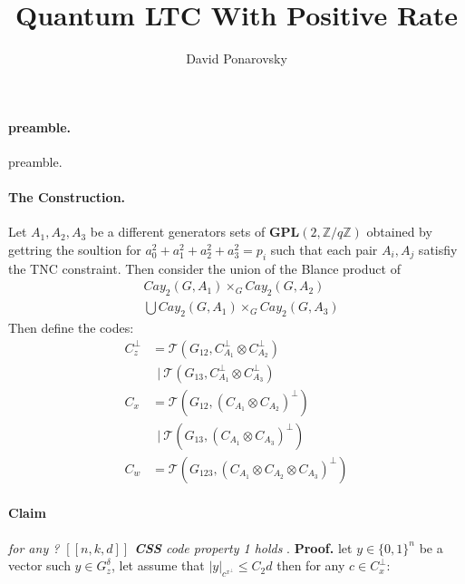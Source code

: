 \documentclass{article}
\newcommand{\Gz}{ G_{z}^{\delta} }
\begin{document}
\title{Quantum LTC With Positive Rate}
\author{David Ponarovsky}
\maketitle
\begin{multicols*}{2}


  \paragraph{preamble.} preamble.  
  \paragraph{The Construction.} Let $A_{1},A_{2},A_{3}$ be a different generators sets of $ \mathbf{GPL}(2 , \mathbb{Z} / q\mathbb{Z} )  $ 
  obtained by gettring the soultion for $a_{0}^{2} + a_{1}^{2} +a_{2}^{2} +a_{3}^{2} = p_i $ such that each pair $A_i,A_j$ satisfiy the 
  TNC constraint. Then consider the union of the Blance product of 
  \begin{equation*}
    \begin{split}
      & Cay_{2}\left(  G, A_{1} \right)\times_{G} Cay_{2}\left(  G, A_{2} \right) \\
      & \bigcup Cay_{2}\left(  G, A_{1} \right)\times_{G} Cay_{2}\left(  G, A_{3} \right) 
    \end{split}
  \end{equation*}
   Then define the codes:
	\begin{equation*}
	  \begin{split}
	    C_{z}^{\perp} & = \mathcal{T}\left( G_{12}, C_{A_1}^{\perp} \otimes  C_{A_2}^{\perp}  \right) \\
	    & \ \ | \ \mathcal{T}\left( G_{13}, C_{A_1}^{\perp} \otimes C_{A_3}^{\perp}  \right) \\
	    C_{x} &=  \mathcal{T}\left( G_{12}, \left(  C_{A_1} \otimes C_{A_2} \right)^{\perp}  \right) \\
	    & \ \ | \ \mathcal{T}\left( G_{13}, \left(  C_{A_1} \otimes C_{A_3} \right)^{\perp}  \right) \\
	    C_{w} &=  \mathcal{T}\left( G_{123}, \left(  C_{A_1} \otimes C_{A_2} \otimes C_{A_3} \right)^{\perp}  \right)   
	  \end{split}
	\end{equation*}

   \paragraph{Claim} \textit{ for any ?  $ \left[ \left[ n,k,d \right] \right] $ \textbf{CSS} code property 1 holds }. 
\textbf{Proof.} let $y \in \{0,1\}^{n}$ be a vector such $ y \in \Gz $, let assume that $|y|_{c^{x^{\perp}}} \le C_{2} d$ then for any $ c \in C_{x}^{\perp}$: 


\end{multicols*}
\end{document}
